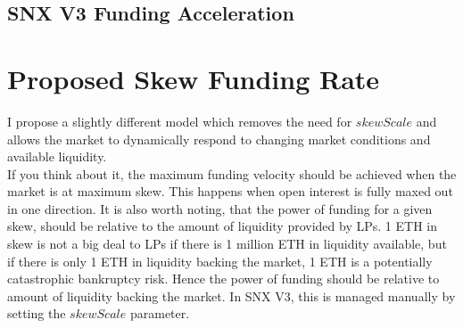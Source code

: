 \documentclass[]{article}
\begin{document}
\subsection{SNX V3 Funding Acceleration}



\section{Proposed Skew Funding Rate}

I propose a slightly different model which removes the need for $skewScale$ and allows the market to dynamically respond to changing market conditions and available liquidity.\\

If you think about it, the maximum funding velocity should be achieved when the market is at maximum skew. This happens when open interest is fully maxed out in one direction. It is also worth noting, that the power of funding for a given skew, should be relative to the amount of liquidity provided by LPs. 1 ETH in skew is not a big deal to LPs if there is 1 million ETH in liquidity available, but if there is only 1 ETH in liquidity backing the market, 1 ETH is a potentially catastrophic bankruptcy risk. Hence the power of funding should be relative to amount of liquidity backing the market. In SNX V3, this is managed manually by setting the $skewScale$ parameter.\\
\end{document}
